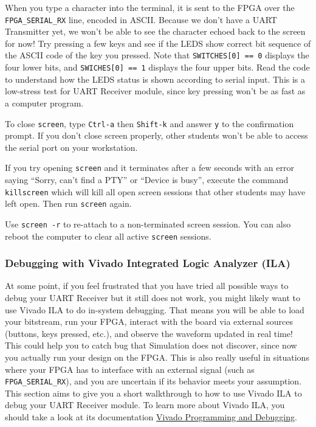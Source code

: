 \documentclass[11pt]{article}
\begin{document}
When you type a character into the terminal, it is sent to the FPGA over the \verb|FPGA_SERIAL_RX| line, encoded in ASCII. Because we don't have a UART Transmitter yet, we won't be able to see the character echoed back to the screen for now! Try pressing a few keys and see if the LEDS show correct bit sequence of the ASCII code of the key you pressed. Note that \verb|SWITCHES[0] == 0| displays the four lower bits, and \verb|SWICHES[0] == 1| displays the four upper bits. Read the code to understand how the LEDS status is shown according to serial input. This is a low-stress test for UART Receiver module, since key pressing won't be as fast as a computer program.

To close \verb|screen|, type \verb|Ctrl-a| then \verb|Shift-k| and answer \verb|y| to the confirmation prompt.
If you don't close screen properly, other students won't be able to access the serial port on your workstation.

If you try opening \verb|screen| and it terminates after a few seconds with an error saying ``Sorry, can't find a PTY'' or ``Device is busy'', execute the command \verb|killscreen| which will kill all open screen sessions that other students may have left open.
Then run \verb|screen| again.

Use \verb|screen -r| to re-attach to a non-terminated screen session. You can also reboot the computer to clear all active \verb|screen| sessions.

\subsubsection{Debugging with Vivado Integrated Logic Analyzer (ILA)}

At some point, if you feel frustrated that you have tried all possible ways to debug your UART Receiver but it still does not work, you might likely want to use Vivado ILA to do in-system debugging. That means you will be able to load your bitstream, run your FPGA, interact with the board via external sources (buttons, keys pressed, etc.), and observe the waveform updated in real time! This could help you to catch bug that Simulation does not discover, since now you actually run your design on the FPGA. This is also really useful in situations where your FPGA has to interface with an external signal (such as \verb|FPGA_SERIAL_RX|), and you are uncertain if its behavior meets your assumption. This section aims to give you a short walkthrough to how to use Vivado ILA to debug your UART Receiver module. To learn more about Vivado ILA, you should take a look at its documentation \href{https://www.xilinx.com/support/documentation/sw_manuals/xilinx2019_2/ug908-vivado-programming-debugging.pdf}{Vivado Programming and Debugging}.
\end{document}
